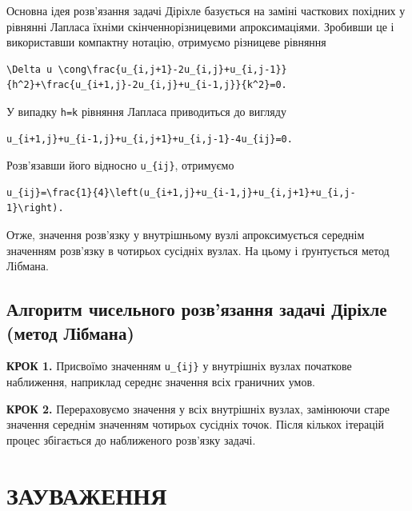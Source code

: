 \documentclass[
  ukrainian,
]{article}
\begin{document}
Основна ідея розв'язання задачі Діріхле базується на заміні часткових
похідних у рівнянні Лапласа їхніми скінченнорізницевими апроксимаціями.
Зробивши це і використавши компактну нотацію, отримуємо різницеве
рівняння

\begin{verbatim}
\Delta u \cong\frac{u_{i,j+1}-2u_{i,j}+u_{i,j-1}}{h^2}+\frac{u_{i+1,j}-2u_{i,j}+u_{i-1,j}}{k^2}=0.
\end{verbatim}

У випадку \texttt{h=k} рівняння Лапласа приводиться до вигляду

\begin{verbatim}
u_{i+1,j}+u_{i-1,j}+u_{i,j+1}+u_{i,j-1}-4u_{ij}=0.
\end{verbatim}

Розв'язавши його відносно \texttt{u\_\{ij\}}, отримуємо

\begin{verbatim}
u_{ij}=\frac{1}{4}\left(u_{i+1,j}+u_{i-1,j}+u_{i,j+1}+u_{i,j-1}\right).
\end{verbatim}

Отже, значення розв'язку у внутрішньому вузлі апроксимується середнім
значенням розв'язку в чотирьох сусідніх вузлах. На цьому і ґрунтується
метод Лібмана.

\subsection{Алгоритм чисельного розв'язання задачі Діріхле (метод
Лібмана)}\label{ux430ux43bux433ux43eux440ux438ux442ux43c-ux447ux438ux441ux435ux43bux44cux43dux43eux433ux43e-ux440ux43eux437ux432ux44fux437ux430ux43dux43dux44f-ux437ux430ux434ux430ux447ux456-ux434ux456ux440ux456ux445ux43bux435-ux43cux435ux442ux43eux434-ux43bux456ux431ux43cux430ux43dux430}

\textbf{КРОК 1.} Присвоїмо значенням \texttt{u\_\{ij\}} у внутрішніх
вузлах початкове наближення, наприклад середнє значення всіх граничних
умов.

\textbf{КРОК 2.} Перераховуємо значення у всіх внутрішніх вузлах,
замінюючи старе значення середнім значенням чотирьох сусідніх точок.
Після кількох ітерацій процес збігається до наближеного розв'язку
задачі.

\section{ЗАУВАЖЕННЯ}\label{ux437ux430ux443ux432ux430ux436ux435ux43dux43dux44f-8}
\end{document}
